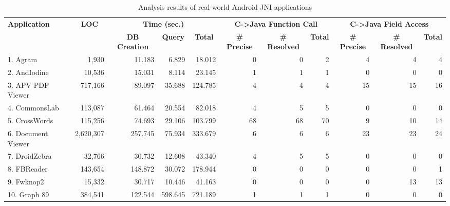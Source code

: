 \begin{table*}[t]
  \caption{Analysis results of real-world Android JNI applications}
  \label{table:RQ1-2}
  \vspace*{-.5em}
  \centering
  \footnotesize
  \begin{tabular}{@{}l|r||r|r|r||r|r|r||r|r|r@{}}
    \multirow{2}{*}{\textbf{Application}} & \multicolumn{1}{c||}{\multirow{2}{*}{\textbf{LOC}}} & \multicolumn{3}{c||}{\textbf{Time (sec.)}} & \multicolumn{3}{c||}{\textbf{C->Java Function Call}} & \multicolumn{3}{c}{\textbf{C->Java Field Access}} \\
    \hhline{~|~||---||---||---}
    & & \multicolumn{1}{c|}{\textbf{DB Creation}} & \multicolumn{1}{c|}{\textbf{Query}} & \multicolumn{1}{c||}{\textbf{Total}} & \multicolumn{1}{c|}{\textbf{\# Precise}} & \multicolumn{1}{c|}{\textbf{\# Resolved}} & \multicolumn{1}{c||}{\textbf{Total}} & \multicolumn{1}{c|}{\textbf{\# Precise}} & \multicolumn{1}{c|}{\textbf{\# Resolved}} & \multicolumn{1}{l}{\textbf{Total}} \\
    \hhline{=|=#=|=|=#=|=|=#=|=|=}
    1. Agram                 & 1,930     & 11.183  & 6.829   & 18.012  & 0   & 0   & 2   & 4   & 4   & 4   \\
    2. AndIodine             & 10,536    & 15.031  & 8.114   & 23.145  & 1   & 1   & 1   & 0   & 0   & 0   \\
    3. APV PDF Viewer        & 717,166   & 89.097  & 35.688  & 124.785 & 4   & 4   & 4   & 15  & 15  & 16  \\
    4. CommonsLab            & 113,087   & 61.464  & 20.554  & 82.018  & 4   & 5   & 5   & 0   & 0   & 0   \\
    5. CrossWords            & 115,256   & 74.693  & 29.106  & 103.799 & 68  & 68  & 70  & 9   & 10  & 14  \\
    6. Document Viewer       & 2,620,307 & 257.745 & 75.934  & 333.679 & 6   & 6   & 6   & 23  & 23  & 24  \\
    7. DroidZebra            & 32,766    & 30.732  & 12.608  & 43.340  & 4   & 5   & 5   & 0   & 0   & 0   \\
    8. FBReader              & 143,654   & 148.872 & 30.072  & 178.944 & 0   & 0   & 0   & 0   & 0   & 1   \\
    9. Fwknop2               & 15,332    & 30.717  & 10.446  & 41.163  & 0   & 0   & 0   & 0   & 13  & 13  \\
    10. Graph 89             & 384,541   & 122.544 & 598.645 & 721.189 & 1   & 1   & 1   & 0   & 0   & 0   \\

\end{tabular}
\end{table*}
